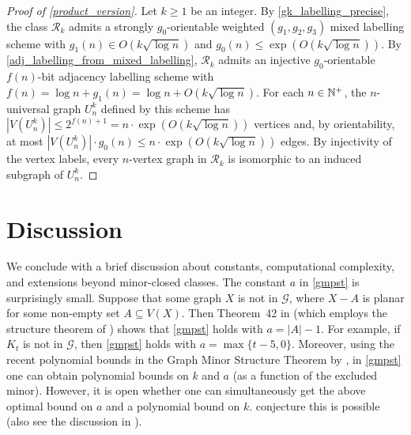 \documentclass{patmorin}
\renewcommand{\ge}{\geqslant}
\renewcommand{\le}{\leqslant}
\newcommand{\Oh}{O}
\newcommand{\calG}{\mathcal{G}}
\newcommand{\calR}{\mathcal{R}}
\begin{document}
\begin{proof}[Proof of \cref{product_version}]
  Let $k\ge 1$ be an integer. By \cref{gk_labelling_precise}, the class $\calR_k$ admits a strongly $g_0$-orientable weighted $(g_1,g_2,g_3)$ mixed labelling scheme with $g_1(n)\in \Oh(k\sqrt{\log n})$ and $g_0(n)\le \exp(\Oh(k\sqrt{\log n}))$. By \cref{adj_labelling_from_mixed_labelling}, $\calR_k$ admits an injective $g_0$-orientable $f(n)$-bit adjacency labelling scheme with $f(n) = \log n + g_1(n) = \log n + \Oh(k\sqrt{\log n})$. For each $n\in\mathbb{N}^+$, the $n$-universal graph $U^k_n$ defined by this scheme has $|V(U^k_n)| \le 2^{f(n)+1} = n\cdot \exp(\Oh(k\sqrt{\log n}))$ vertices and, by orientability, at most $|V(U^k_n)|\cdot g_0(n) \le n\cdot\exp(\Oh(k\sqrt{\log n}))$ edges. By injectivity of the vertex labels, every $n$-vertex graph in $\calR_k$ is isomorphic to an induced subgraph of $U^k_n$.
\end{proof}

\section{Discussion}\label{conclusion}

We conclude with a brief discussion about constants, computational complexity, and extensions beyond minor-closed classes.  The constant $a$ in \cref{gmpst} is surprisingly small. Suppose that some graph $X$ is not in $\calG$, where $X-A$ is planar for some non-empty set $A\subseteq V(X)$. Then Theorem~42 in \citep{dujmovic.joret.ea:planar} (which employs the structure theorem of \citet{DvoTho}) shows that \cref{gmpst} holds with $a=|A|-1$. For example, if $K_t$ is not in $\calG$, then \cref{gmpst} holds with $a=\max\{t-5,0\}$. Moreover, using the recent polynomial bounds in the Graph Minor Structure Theorem by \citet{gorsky2025polynomial}, in \cref{gmpst} one can obtain polynomial bounds on $k$ and $a$ (as a function of the excluded minor). However, it is open whether one can simultaneously get the above optimal bound on $a$ and a polynomial bound on $k$. \citet[Conjecture~18.9]{gorsky2025polynomial} conjecture this is possible (also see the discussion in \citep{GSW26}).
\end{document}
